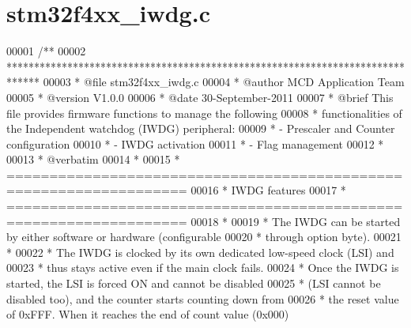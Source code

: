 \section{stm32f4xx\+\_\+iwdg.\+c}
\label{stm32f4xx__iwdg_8c_source}

\begin{DoxyCode}
00001 \textcolor{comment}{/**}
00002 \textcolor{comment}{  ******************************************************************************}
00003 \textcolor{comment}{  * @file    stm32f4xx\_iwdg.c}
00004 \textcolor{comment}{  * @author  MCD Application Team}
00005 \textcolor{comment}{  * @version V1.0.0}
00006 \textcolor{comment}{  * @date    30-September-2011}
00007 \textcolor{comment}{  * @brief   This file provides firmware functions to manage the following }
00008 \textcolor{comment}{  *          functionalities of the Independent watchdog (IWDG) peripheral:           }
00009 \textcolor{comment}{  *           - Prescaler and Counter configuration}
00010 \textcolor{comment}{  *           - IWDG activation}
00011 \textcolor{comment}{  *           - Flag management}
00012 \textcolor{comment}{  *}
00013 \textcolor{comment}{  *  @verbatim  }
00014 \textcolor{comment}{  *  }
00015 \textcolor{comment}{  *          ===================================================================}
00016 \textcolor{comment}{  *                                     IWDG features}
00017 \textcolor{comment}{  *          ===================================================================}
00018 \textcolor{comment}{  *    }
00019 \textcolor{comment}{  *          The IWDG can be started by either software or hardware (configurable}
00020 \textcolor{comment}{  *          through option byte).}
00021 \textcolor{comment}{  *            }
00022 \textcolor{comment}{  *          The IWDG is clocked by its own dedicated low-speed clock (LSI) and}
00023 \textcolor{comment}{  *          thus stays active even if the main clock fails.}
00024 \textcolor{comment}{  *          Once the IWDG is started, the LSI is forced ON and cannot be disabled}
00025 \textcolor{comment}{  *          (LSI cannot be disabled too), and the counter starts counting down from }
00026 \textcolor{comment}{  *          the reset value of 0xFFF. When it reaches the end of count value (0x000)}

\end{DoxyCode}
